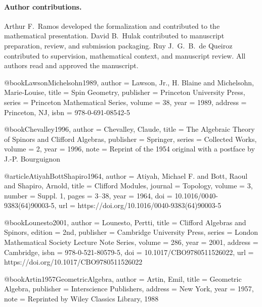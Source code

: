 \documentclass{birkjour}
\theoremstyle{plain}
\theoremstyle{definition}
\theoremstyle{remark}
\begin{document}
\paragraph{Author contributions.}
Arthur F.~Ramos developed the formalization and contributed to the mathematical
presentation. David B.~Hulak contributed to manuscript preparation, review, and
submission packaging. Ruy J.~G.~B.~de Queiroz contributed to supervision,
mathematical context, and manuscript review. All authors read and approved the
manuscript.

\begingroup
\raggedright

@book{LawsonMichelsohn1989,
  author    = {Lawson, Jr., H. Blaine and Michelsohn, Marie-Louise},
  title     = {Spin Geometry},
  publisher = {Princeton University Press},
  series    = {Princeton Mathematical Series},
  volume    = {38},
  year      = {1989},
  address   = {Princeton, NJ},
  isbn      = {978-0-691-08542-5}
}

@book{Chevalley1996,
  author    = {Chevalley, Claude},
  title     = {The Algebraic Theory of Spinors and Clifford Algebras},
  publisher = {Springer},
  series    = {Collected Works},
  volume    = {2},
  year      = {1996},
  note      = {Reprint of the 1954 original with a postface by J.-P. Bourguignon}
}

@article{AtiyahBottShapiro1964,
  author  = {Atiyah, Michael F. and Bott, Raoul and Shapiro, Arnold},
  title   = {Clifford Modules},
  journal = {Topology},
  volume  = {3},
  number  = {Suppl. 1},
  pages   = {3--38},
  year    = {1964},
  doi     = {10.1016/0040-9383(64)90003-5},
  url     = {https://doi.org/10.1016/0040-9383(64)90003-5}
}

@book{Lounesto2001,
  author    = {Lounesto, Pertti},
  title     = {Clifford Algebras and Spinors},
  edition   = {2nd},
  publisher = {Cambridge University Press},
  series    = {London Mathematical Society Lecture Note Series},
  volume    = {286},
  year      = {2001},
  address   = {Cambridge},
  isbn      = {978-0-521-80579-5},
  doi       = {10.1017/CBO9780511526022},
  url       = {https://doi.org/10.1017/CBO9780511526022}
}

@book{Artin1957GeometricAlgebra,
  author    = {Artin, Emil},
  title     = {Geometric Algebra},
  publisher = {Interscience Publishers},
  address   = {New York},
  year      = {1957},
  note      = {Reprinted by Wiley Classics Library, 1988}
}
\end{document}

